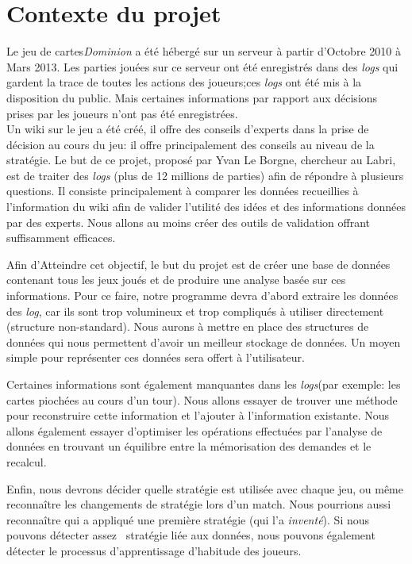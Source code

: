 \documentclass{scrreprt}
\begin{document}
\section{Contexte du projet}
  Le jeu de cartes\textit{Dominion} a été hébergé sur un serveur à partir d'Octobre 2010 à Mars 2013. Les parties jouées sur ce serveur ont été enregistrés dans des \textit{logs} qui gardent la trace de toutes les actions des joueurs;ces \textit{logs} ont été mis à la disposition du public. Mais certaines informations par rapport aux décisions prises par les joueurs n’ont pas été enregistrées.\\
 Un wiki sur le jeu a été créé, il offre des conseils d'experts dans la prise de décision au cours du jeu: il offre principalement des conseils au niveau de la stratégie. Le but de ce projet, proposé par Yvan Le Borgne, chercheur au Labri, est de traiter des \textit{logs} (plus de 12 millions de parties) afin de répondre à plusieurs questions. Il consiste principalement à comparer les données recueillies à l'information du wiki afin de valider l'utilité des idées et des informations données par des experts. Nous allons au moins créer des outils de validation offrant suffisamment efficaces.
  
Afin d'Atteindre cet objectif, le but du projet est de créer une base de données contenant tous les jeux joués et de produire une analyse basée sur ces informations. Pour ce faire, notre programme devra d'abord extraire les données des \textit{log}, car ils sont trop volumineux et trop compliqués à utiliser directement (structure non-standard). Nous aurons à mettre en place des structures de données qui nous permettent d'avoir un meilleur stockage de données. Un moyen simple pour représenter ces données sera offert à l'utilisateur.

  Certaines informations sont également manquantes dans les \textit{logs}(par exemple: les cartes piochées au cours d'un tour). Nous allons essayer de trouver une méthode pour reconstruire cette information et l'ajouter à l'information existante. Nous allons également essayer d'optimiser les opérations effectuées par l'analyse de données en trouvant un équilibre entre la mémorisation des demandes et le recalcul.

  Enfin, nous devrons décider quelle stratégie est utilisée avec chaque jeu, ou même reconnaître les changements de stratégie lors d'un match. Nous pourrions aussi reconnaître qui a appliqué une première stratégie (qui l'a \textit{inventé}). Si nous pouvons détecter assez  stratégie liée aux données, nous pouvons également détecter le processus d'apprentissage d'habitude des joueurs.
\end{document}
